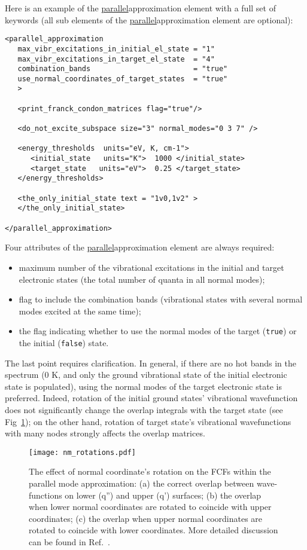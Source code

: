\documentclass[11pt]{article}
\begin{document}
Here is an example of the \ul{parallel}{approximation} element with a full
set of keywords (all sub elements of the \ul{parallel}{approximation} element are optional):
\begin{lstlisting}[frame=single,framerule=0pt]
<parallel_approximation
   max_vibr_excitations_in_initial_el_state = "1"
   max_vibr_excitations_in_target_el_state  = "4"
   combination_bands                        = "true"
   use_normal_coordinates_of_target_states  = "true"
   >

   <print_franck_condon_matrices flag="true"/>

   <do_not_excite_subspace size="3" normal_modes="0 3 7" />

   <energy_thresholds  units="eV, K, cm-1">
      <initial_state   units="K">  1000 </initial_state>
      <target_state   units="eV">  0.25 </target_state>
   </energy_thresholds>

   <the_only_initial_state text = "1v0,1v2" >
   </the_only_initial_state>

</parallel_approximation>
\end{lstlisting}
Four attributes of the \ul{parallel}{approximation} element are always required:
\begin{itemize}
\item maximum number of the vibrational excitations in the initial and target electronic states
(the total number of quanta in all normal modes);
\item flag to include the combination bands (vibrational states with several normal modes excited at the same time);
\item the flag indicating whether to use the normal modes of the target ({\tt true}) or the initial ({\tt false}) state.
\end{itemize}
The last point requires clarification. In general, if there are no hot bands in the spectrum 
(0 K, and only the ground vibrational state of the initial electronic state is populated),
using the normal modes of the target electronic state is preferred. 
Indeed, rotation of
the initial ground states' vibrational wavefunction does not significantly change the overlap integrals with
the target state (see Fig~\ref{fig:rotations}); on the other hand, rotation of target state's vibrational wavefunctions with many 
nodes strongly affects the overlap matrices.

\begin{figure}[h!]
  \centering
  \caption{The effect of normal coordinate's rotation on the FCFs within the parallel mode
approximation: (a) the correct overlap between wave-functions on lower (q'') and upper (q') surfaces;
(b) the overlap when lower normal coordinates are rotated to coincide with upper coordinates;
(c) the overlap when upper normal coordinates are rotated to coincide with lower coordinates. 
More detailed discussion can be found in Ref.~\cite{Koziol:HCOH:2009}.}
  \texttt{[image: nm\_rotations.pdf]}
  \label{fig:rotations}
\end{figure}
\end{document}
